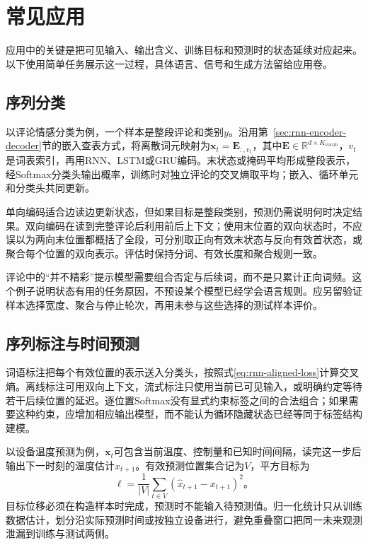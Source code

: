\section{常见应用}
\label{sec:rnn-applications}

应用中的关键是把可见输入、输出含义、训练目标和预测时的状态延续对应起来。以下使用简单任务展示这一过程，具体语言、信号和生成方法留给应用卷。

\subsection{序列分类}
\label{sec:rnn-application-classification}

以评论情感分类为例，一个样本是整段评论和类别$y$。沿用第~\ref{sec:rnn-encoder-decoder}节的嵌入查表方式，将离散词元映射为$\bm{x}_t=\bm{E}_{:,v_t}$，其中$\bm{E}\in\mathbb{R}^{d\times K_{\mathrm{vocab}}}$，$v_t$是词表索引，再用RNN、LSTM或GRU编码。末状态或掩码平均形成整段表示，经Softmax分类头输出概率，训练时对独立评论的交叉熵取平均；嵌入、循环单元和分类头共同更新。

单向编码适合边读边更新状态，但如果目标是整段类别，预测仍需说明何时决定结果。双向编码在读到完整评论后利用前后上下文；使用末位置的双向状态时，不应误以为两向末位置都概括了全段，可分别取正向有效末状态与反向有效首状态，或聚合每个位置的双向表示。评估时保持分词、有效长度和聚合规则一致。

评论中的“并不精彩”提示模型需要组合否定与后续词，而不是只累计正向词频。这个例子说明状态有用的任务原因，不预设某个模型已经学会语言规则。应另留验证样本选择宽度、聚合与停止轮次，再用未参与这些选择的测试样本评价。

\subsection{序列标注与时间预测}
\label{sec:rnn-application-aligned}

词语标注把每个有效位置的表示送入分类头，按照式\eqref{eq:rnn-aligned-loss}计算交叉熵。离线标注可用双向上下文，流式标注只使用当前已可见输入，或明确约定等待若干后续位置的延迟。逐位置Softmax没有显式约束标签之间的合法组合；如果需要这种约束，应增加相应输出模型，而不能认为循环隐藏状态已经等同于标签结构建模。

以设备温度预测为例，$\bm{x}_t$可包含当前温度、控制量和已知时间间隔，读完这一步后输出下一时刻的温度估计$\widehat x_{t+1}$。有效预测位置集合记为$V$，平方目标为
\begin{equation}
  \ell=\frac{1}{|V|}\sum_{t\in V}
      (\widehat x_{t+1}-x_{t+1})^2\text{。}
  \label{eq:rnn-forecast-loss}
\end{equation}
目标位移必须在构造样本时完成，预测时不能输入待预测值。归一化统计只从训练数据估计，划分沿实际预测时间或按独立设备进行，避免重叠窗口把同一未来观测泄漏到训练与测试两侧。

